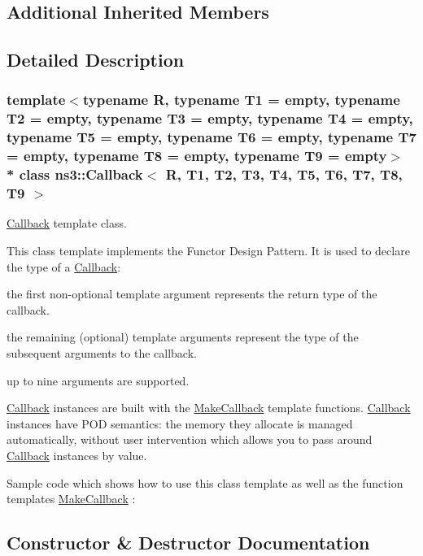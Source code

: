 \subsection*{Additional Inherited Members}


\subsection{Detailed Description}
\subsubsection*{template$<$typename R, typename T1 = empty, typename T2 = empty, typename T3 = empty, typename T4 = empty, typename T5 = empty, typename T6 = empty, typename T7 = empty, typename T8 = empty, typename T9 = empty$>$\\*
class ns3\+::\+Callback$<$ R, T1, T2, T3, T4, T5, T6, T7, T8, T9 $>$}

\hyperlink{classns3_1_1Callback}{Callback} template class. 

This class template implements the Functor Design Pattern. It is used to declare the type of a \hyperlink{classns3_1_1Callback}{Callback}\+:
\begin{DoxyItemize}
\item the first non-\/optional template argument represents the return type of the callback.
\item the remaining (optional) template arguments represent the type of the subsequent arguments to the callback.
\item up to nine arguments are supported.
\end{DoxyItemize}

\hyperlink{classns3_1_1Callback}{Callback} instances are built with the \hyperlink{group__makecallbackmemptr_ga9376283685aa99d204048d6a4b7610a4}{Make\+Callback} template functions. \hyperlink{classns3_1_1Callback}{Callback} instances have P\+OD semantics\+: the memory they allocate is managed automatically, without user intervention which allows you to pass around \hyperlink{classns3_1_1Callback}{Callback} instances by value.

Sample code which shows how to use this class template as well as the function templates \hyperlink{group__makecallbackmemptr_ga9376283685aa99d204048d6a4b7610a4}{Make\+Callback} \+: 
\begin{DoxyCodeInclude}
\end{DoxyCodeInclude}
 

\subsection{Constructor \& Destructor Documentation}
